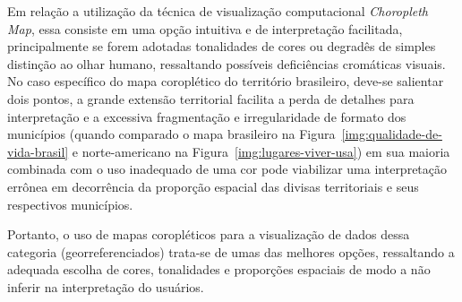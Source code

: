 \documentclass[conference]{IEEEtran}
\begin{document}
Em relação a utilização da técnica de visualização computacional \textit{Choropleth Map}, essa consiste em uma opção intuitiva e de interpretação facilitada, principalmente se forem adotadas tonalidades de cores ou degradês de simples distinção ao olhar humano, ressaltando possíveis deficiências cromáticas visuais. No caso específico do mapa coroplético do território brasileiro, deve-se salientar dois pontos, a grande extensão territorial facilita a perda de detalhes para interpretação e a excessiva fragmentação e irregularidade de formato dos municípios (quando comparado o mapa brasileiro na Figura~\ref{img:qualidade-de-vida-brasil} e norte-americano na Figura~\ref{img:lugares-viver-usa}) em sua maioria combinada com o uso inadequado de uma cor pode viabilizar uma interpretação errônea em decorrência da proporção espacial das divisas territoriais e seus respectivos municípios.

Portanto, o uso de mapas coropléticos para a visualização de dados dessa categoria (georreferenciados) trata-se de umas das melhores opções, ressaltando a adequada escolha de cores, tonalidades e proporções espaciais de modo a não inferir na interpretação do usuários.
\end{document}
